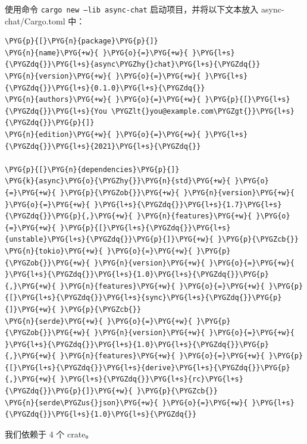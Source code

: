使用命令 \texttt{cargo new --lib async-chat} 启动项目，并将以下文本放入 async-chat/\allowbreak{}Cargo.toml 中：

\begin{Verbatim}[commandchars=\\\{\},breaklines=true,breakanywhere=true,fontsize=\codefont,xleftmargin=17bp]
\PYG{p}{[}\PYG{n}{package}\PYG{p}{]}
\PYG{n}{name}\PYG{+w}{ }\PYG{o}{=}\PYG{+w}{ }\PYG{l+s}{\PYGZdq{}}\PYG{l+s}{async\PYGZhy{}chat}\PYG{l+s}{\PYGZdq{}}
\PYG{n}{version}\PYG{+w}{ }\PYG{o}{=}\PYG{+w}{ }\PYG{l+s}{\PYGZdq{}}\PYG{l+s}{0.1.0}\PYG{l+s}{\PYGZdq{}}
\PYG{n}{authors}\PYG{+w}{ }\PYG{o}{=}\PYG{+w}{ }\PYG{p}{[}\PYG{l+s}{\PYGZdq{}}\PYG{l+s}{You \PYGZlt{}you@example.com\PYGZgt{}}\PYG{l+s}{\PYGZdq{}}\PYG{p}{]}
\PYG{n}{edition}\PYG{+w}{ }\PYG{o}{=}\PYG{+w}{ }\PYG{l+s}{\PYGZdq{}}\PYG{l+s}{2021}\PYG{l+s}{\PYGZdq{}}

\PYG{p}{[}\PYG{n}{dependencies}\PYG{p}{]}
\PYG{k}{async}\PYG{o}{\PYGZhy{}}\PYG{n}{std}\PYG{+w}{ }\PYG{o}{=}\PYG{+w}{ }\PYG{p}{\PYGZob{}}\PYG{+w}{ }\PYG{n}{version}\PYG{+w}{ }\PYG{o}{=}\PYG{+w}{ }\PYG{l+s}{\PYGZdq{}}\PYG{l+s}{1.7}\PYG{l+s}{\PYGZdq{}}\PYG{p}{,}\PYG{+w}{ }\PYG{n}{features}\PYG{+w}{ }\PYG{o}{=}\PYG{+w}{ }\PYG{p}{[}\PYG{l+s}{\PYGZdq{}}\PYG{l+s}{unstable}\PYG{l+s}{\PYGZdq{}}\PYG{p}{]}\PYG{+w}{ }\PYG{p}{\PYGZcb{}}
\PYG{n}{tokio}\PYG{+w}{ }\PYG{o}{=}\PYG{+w}{ }\PYG{p}{\PYGZob{}}\PYG{+w}{ }\PYG{n}{version}\PYG{+w}{ }\PYG{o}{=}\PYG{+w}{ }\PYG{l+s}{\PYGZdq{}}\PYG{l+s}{1.0}\PYG{l+s}{\PYGZdq{}}\PYG{p}{,}\PYG{+w}{ }\PYG{n}{features}\PYG{+w}{ }\PYG{o}{=}\PYG{+w}{ }\PYG{p}{[}\PYG{l+s}{\PYGZdq{}}\PYG{l+s}{sync}\PYG{l+s}{\PYGZdq{}}\PYG{p}{]}\PYG{+w}{ }\PYG{p}{\PYGZcb{}}
\PYG{n}{serde}\PYG{+w}{ }\PYG{o}{=}\PYG{+w}{ }\PYG{p}{\PYGZob{}}\PYG{+w}{ }\PYG{n}{version}\PYG{+w}{ }\PYG{o}{=}\PYG{+w}{ }\PYG{l+s}{\PYGZdq{}}\PYG{l+s}{1.0}\PYG{l+s}{\PYGZdq{}}\PYG{p}{,}\PYG{+w}{ }\PYG{n}{features}\PYG{+w}{ }\PYG{o}{=}\PYG{+w}{ }\PYG{p}{[}\PYG{l+s}{\PYGZdq{}}\PYG{l+s}{derive}\PYG{l+s}{\PYGZdq{}}\PYG{p}{,}\PYG{+w}{ }\PYG{l+s}{\PYGZdq{}}\PYG{l+s}{rc}\PYG{l+s}{\PYGZdq{}}\PYG{p}{]}\PYG{+w}{ }\PYG{p}{\PYGZcb{}}
\PYG{n}{serde\PYGZus{}json}\PYG{+w}{ }\PYG{o}{=}\PYG{+w}{ }\PYG{l+s}{\PYGZdq{}}\PYG{l+s}{1.0}\PYG{l+s}{\PYGZdq{}}
\end{Verbatim}

我们依赖于 4 个 crate。

